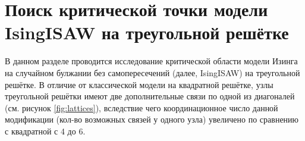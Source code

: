 \section{Поиск критической точки модели IsingISAW на треугольной решётке}

В данном разделе проводится исследование критической области модели Изинга на случайном булжании без самопересечений (далее, IsingISAW) на треугольной решётке.
В отличие от классической модели на квадратной решётке, узлы треугольной решётки имеют две дополнительные связи по одной из диагоналей (см. рисунок \ref{fig:lattices}), 
вследствие чего координационное число данной модификации (кол-во возможных связей у одного узла) увеличено по сравнению с квадратной с 4 до 6.

